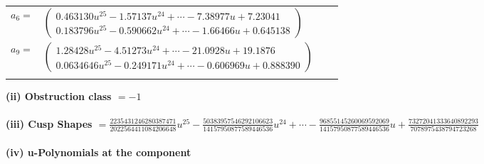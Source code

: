 \documentclass[1p]{elsarticle_modified}
\theoremstyle{definition}
\begin{document}
\begin{tabular}{m{7pt} m{180pt} m{7pt} m{180pt} }
\flushright $a_{6}=$&$\begin{pmatrix}0.463130 u^{25}-1.57137 u^{24}+\cdots-7.38977 u+7.23041\\0.183796 u^{25}-0.590662 u^{24}+\cdots-1.66466 u+0.645138\end{pmatrix}$ \\
\flushright $a_{9}=$&$\begin{pmatrix}1.28428 u^{25}-4.51273 u^{24}+\cdots-21.0928 u+19.1876\\0.0634646 u^{25}-0.249171 u^{24}+\cdots-0.606969 u+0.888390\end{pmatrix}$\\&\end{tabular}
\flushleft \textbf{(ii) Obstruction class $= -1$}\\~\\
\flushleft \textbf{(iii) Cusp Shapes $= \frac{2235431246280387471}{2022564411084206648} u^{25}-\frac{50383957546292106623}{14157950877589446536} u^{24}+\cdots-\frac{96855145260069592069}{14157950877589446536} u+\frac{73272041333640892293}{7078975438794723268}$}\\~\\
\newpage\renewcommand{\arraystretch}{1}
\flushleft \textbf{(iv) u-Polynomials at the component}\newline \\
\end{document}
